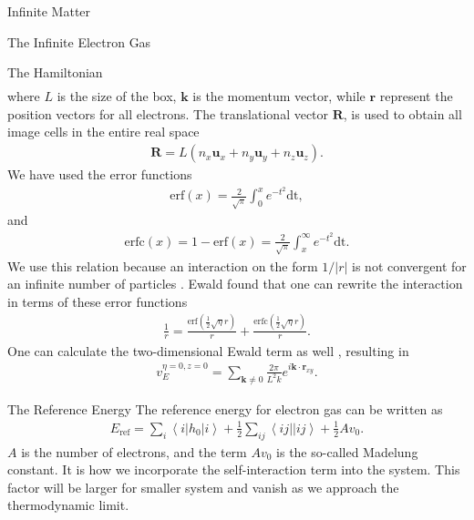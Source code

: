 \documentclass[twoside,english]{uiofysmaster}
\begin{document}
\begin{chapter}{Infinite Matter}
\begin{section}{The Infinite Electron Gas}
\begin{subsection}{The Hamiltonian}
\begin{align}
			\end{align}
			where $L$ is the size of the box, $\mathbf{k}$ is the momentum vector, while $\mathbf{r}$ represent the position vectors for all electrons. The translational vector $\mathbf{R}$, is used to obtain all image cells in the entire real space \cite{MHJonline}
			\begin{align}
				\mathbf{R} = L(n_x \mathbf{u}_x + n_y \mathbf{u}_y + n_z \mathbf{u}_z).
			\end{align}
			We have used the error functions
			\begin{align}
				\text{erf}(x) = \frac{2}{\sqrt{\pi}} \int_0^x e^{-t^2} \text{dt},
			\end{align}
			and
			\begin{align}
				\text{erfc}(x) = 1 - \text{erf}(x) = \frac{2}{\sqrt{\pi}} \int_x^\infty e^{-t^2} \text{dt}.
			\end{align}
			We use this relation because an interaction on the form $1/|r|$ is not convergent for an infinite number of particles \cite{Audun}. Ewald found that one can rewrite the interaction in terms of these error functions \cite{Ewald}
			\begin{align}
				\frac{1}{r} = \frac{\text{erf}(\frac{1}{2}\sqrt{\eta}r)}{r} + \frac{\text{erfc}(\frac{1}{2}\sqrt{\eta}r)}{r}.
			\end{align}
			One can calculate the two-dimensional Ewald term as well \cite{Baardsen}, resulting in 
			\begin{align}
				v_E^{\eta=0, z=0} = \sum_{\mathbf{k} \neq 0} \frac{2 \pi}{L^2 k} e^{i \mathbf{k} \cdot \mathbf{r}_{xy}}.
			\end{align}
		\end{subsection}
		
		\begin{subsection}{The Reference Energy}
			The reference energy for electron gas can be written as \cite{Baardsen}
			\begin{align}
				E_{\text{ref}} = \sum_i \left<i | h_0 | i\right> + \frac{1}{2} \sum_{ij} \left<ij||ij\right> + \frac{1}{2} Av_0.
			\end{align}
			$A$ is the number of electrons, and the term $A v_0$ is the so-called Madelung constant. It is how we incorporate the self-interaction term into the system. This factor will be larger for smaller system and vanish as we approach the thermodynamic limit. 
		\end{subsection}
		

\end{section}
\end{chapter}
\end{document}
